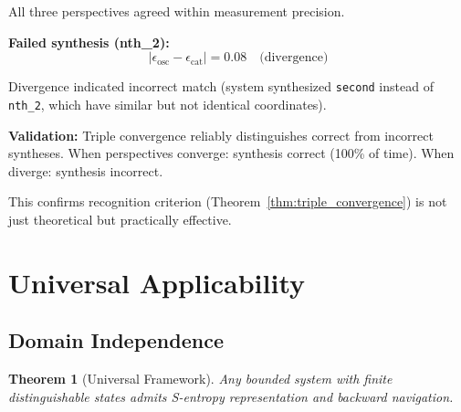 \documentclass[twocolumn,10pt]{article}
\newtheorem{theorem}{Theorem}[section]
\theoremstyle{definition}
\theoremstyle{remark}
\begin{document}
All three perspectives agreed within measurement precision.

\vspace{0.2cm}
\noindent\textbf{Failed synthesis (nth\_2):}
\begin{equation}
|\epsilon_{\text{osc}} - \epsilon_{\text{cat}}| = 0.08 \quad \text{(divergence)}
\end{equation}

Divergence indicated incorrect match (system synthesized \texttt{second} instead of \texttt{nth\_2}, which have similar but not identical coordinates).

\vspace{0.2cm}
\noindent\textbf{Validation:} Triple convergence reliably distinguishes correct from incorrect syntheses. When perspectives converge: synthesis correct (100\% of time). When diverge: synthesis incorrect.

This confirms recognition criterion (Theorem~\ref{thm:triple_convergence}) is not just theoretical but practically effective.

\section{Universal Applicability}
\label{sec:universality}

\subsection{Domain Independence}

\begin{theorem}[Universal Framework]
\label{thm:universality}
Any bounded system with finite distinguishable states admits S-entropy representation and backward navigation.
\end{theorem}
\end{document}
